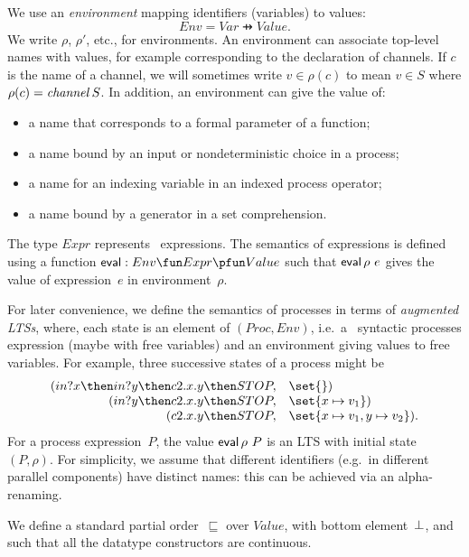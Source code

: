 We use an \emph{environment} mapping identifiers (variables) to values:
\[
Env = Var \pfun Value.
\]
We write $\rho$, $\rho'$, etc., for environments.  An environment can
associate top-level names with values, for example corresponding to the
declaration of channels.  If $c$ is the name of a channel, we will sometimes
write $v \in \rho(c)$ to mean $v \in S$ where $\rho(c) = \mathop{\it channel} S$.
In addition, an environment can give the value of:
%
\begin{itemize}
\item a name that corresponds to a formal parameter of a function;
\item a name bound by an input or nondeterministic choice in a process;
\item a name for an indexing variable in an indexed process operator;
\item a name bound by a generator in a set comprehension.
\end{itemize}


The type $Expr$ represents \CSPm\ expressions.  The semantics of expressions is
defined using a function $\eval : Env \fun Expr \pfun Value$ such that
$\mathop{\sf eval} \rho~e$ gives the value of expression~$e$ in environment~$\rho$.

For later convenience, we define the semantics of processes in terms of
\emph{augmented LTSs}, where, each state is an element of $(Proc, Env)$,
i.e.~a \CSPm\ syntactic processes expression (maybe with free variables) and
an environment giving values to free variables.  For example, three successive
states of a process might be
\[
\begin{array}{rl}
(in?x \then in?y \then c2.x.y \then STOP, & \set{}) \\
(in?y \then c2.x.y \then STOP, & \set{x \mapsto v_1}) \\
(c2.x.y \then STOP, & \set{x \mapsto v_1, y \mapsto v_2}).
\end{array}
\]
For a process expression~$P$, the value $\mathop{\sf eval} \rho~P$ is an
LTS with initial state $(P,\rho)$.
For simplicity, we assume that different identifiers (e.g.~in different
parallel components) have distinct names: this can be achieved via an
alpha-renaming.  


We define a standard partial order~$\sqsubseteq$ over $Value$, with bottom
element~$\perp$, and such that all the datatype constructors are continuous.

